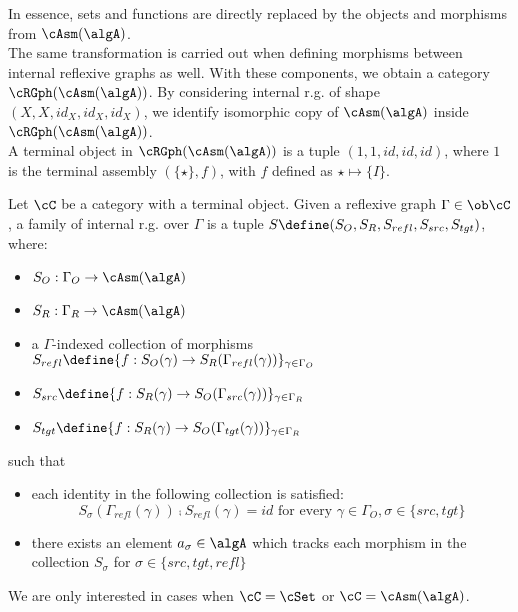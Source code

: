 \documentclass[12pt,a4paper]{article}
\def\src{_{src}}\alwaysmath{src}
\def\rfl{_{refl}}\alwaysmath{rfl}
\def\tgt{_{tgt}}\alwaysmath{tgt}
\renewcommand{\O}{_{O}}\alwaysmath{O}
\def\R{_{R}}\alwaysmath{R}
\begin{document}
In essence, sets and functions are directly replaced by the objects and morphisms from $\cAsm(\algA)$.\\
The same transformation is carried out when defining morphisms between internal reflexive graphs as well. With these components, we obtain a category $\cRGph(\cAsm(\algA))$. By considering internal r.g. of shape $(X,X,id_X,id_X,id_X)$, we identify isomorphic copy of $\cAsm(\algA)$ inside $\cRGph(\cAsm(\algA))$.\\
A terminal object in $\cRGph(\cAsm(\algA))$ is a tuple $(1, 1, id, id, id)$, where $1$ is the terminal assembly $(\{\star\},f)$, with $f$ defined as $\star \mapsto \{I\}$.

\begin{definition}
  \label{def:fam-refl-graphs}
  Let $\cC$ be a category with a terminal object. Given a reflexive graph $\Gamma \in \ob\cC$, a family of internal r.g. over $\Gamma$ is a tuple $S\define(S_O, S_R, S\rfl, S\src, S\tgt)$, where:
  \begin{itemize}[noitemsep]
    \item $S\O : \Gamma\O \to \cAsm(\algA)$
    \item $S\R : \Gamma\R \to \cAsm(\algA)$
    \item a $\Gamma$-indexed collection of morphisms $S\rfl \define \{f: S\O(\gamma) \to S\R(\Gamma\rfl(\gamma)) \}_{\gamma \in \Gamma\O}$
    \item $S\src \define \{f: S\R(\gamma) \to S\O(\Gamma\src(\gamma)) \}_{\gamma \in \Gamma\R}$
    \item $S\tgt \define \{f: S\R(\gamma) \to S\O(\Gamma\tgt(\gamma)) \}_{\gamma \in \Gamma\R}$ 
  \end{itemize}
  such that 
  \begin{itemize}[noitemsep]
    \item each identity in the following collection is satisfied:
     $$S_\sigma(\Gamma\rfl(\gamma)) \comp S\rfl(\gamma) = id \text{ for every } \gamma \in \Gamma\O, \sigma \in \{src, tgt \}$$
     
     \item there exists an element $a_\sigma \in \algA$ which tracks each morphism in the collection $S_\sigma$ for $\sigma \in \{src,tgt,refl\}$
  \end{itemize}
\end{definition}
We are only interested in cases when $\cC = \cSet$ or $\cC = \cAsm(\algA)$. 
\end{document}
